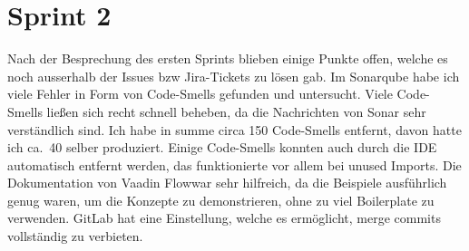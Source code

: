

\section{Sprint 2}\label{sec:sprint2}
Nach der Besprechung des ersten Sprints blieben einige Punkte offen, welche es noch ausserhalb der Issues bzw Jira-Tickets zu lösen gab.
Im Sonarqube habe ich viele Fehler in Form von Code-Smells gefunden und untersucht.
Viele Code-Smells ließen sich recht schnell beheben, da die Nachrichten von Sonar sehr verständlich sind.
Ich habe in summe circa 150 Code-Smells entfernt, davon hatte ich ca.\ 40 selber produziert.
Einige Code-Smells konnten auch durch die IDE automatisch entfernt werden, das funktionierte vor allem bei unused Imports.
Die Dokumentation von Vaadin Flow\cite*[]{flowdocumentation}war sehr hilfreich, da die Beispiele ausführlich genug waren,
um die Konzepte zu demonstrieren, ohne zu viel Boilerplate zu verwenden.
GitLab hat eine Einstellung, welche es ermöglicht, merge commits vollständig zu verbieten.

